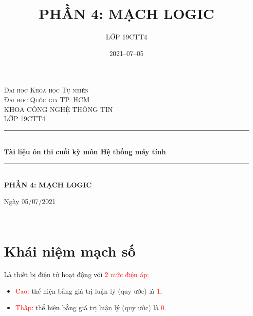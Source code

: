 \documentclass[12pt]{article}
\title{PHẦN 4: MẠCH LOGIC}
\author{LỚP 19CTT4}
\date{2021–07–05}
\begin{document}
\begin{sloppypar}

\begin{titlepage}
    
    \newcommand{\HRule}{\rule{\linewidth}{0.5mm}} %
    
    \center %
    \vspace*{\fill}
     
    \textsc{\LARGE Đại học Khoa học Tự nhiên}\\[0.2cm]
    \textsc{\large Đại học Quốc gia TP. HCM }\\[1.5cm] 
    \textsc{\Large KHOA CÔNG NGHỆ THÔNG TIN}\\[0.2cm] 
    \textsc{\large LỚP 19CTT4 }\\[0.5cm]
    \HRule \\[0.4cm]
    { \huge \bfseries Tài liệu ôn thi cuối kỳ môn\break 
    Hệ thống máy tính}\\[0.4cm] %
    \HRule \\[1.5cm]
    \LARGE \textbf {PHẦN 4: MẠCH LOGIC \\}
    
    \begin{minipage}{1\textwidth}
    \begin{center}
        \LARGE Ngày 05/07/2021
    \end{center}
    \end{minipage}\\[2cm]
    \vspace*{\fill} %
    \end{titlepage}


    \renewcommand*\contentsname{\begin{center} \LARGE Mục lục \end{center}}
    \tableofcontents
    \pagebreak
\section{Khái niệm mạch số}

Là thiết bị điện tử hoạt động với \textcolor{red}{2 mức điện áp:}

\begin{itemize}

    \item \textcolor{red}{Cao:} thể hiện bằng giá trị luận lý (quy ước) là \textcolor{red}{1}.
    \item \textcolor{red}{Thấp:} thể hiện bằng giá trị luận lý (quy ước) là \textcolor{red}{0}. 
\end{itemize}



\end{sloppypar}
\end{document}
